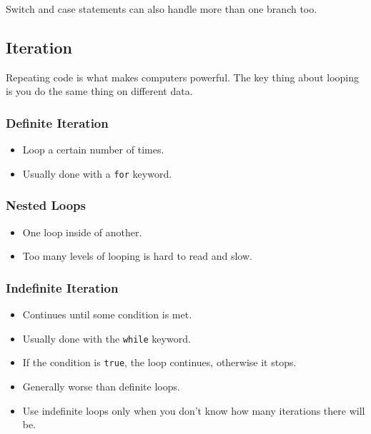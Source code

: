\begin{note}
    Switch and case statements can also handle more than one branch too.
\end{note}

\subsection{Iteration}\label{sub:iteration}

Repeating code is what makes computers powerful.
The key thing about looping is you do the same thing on different data.

\subsubsection{Definite Iteration}\label{ssub:definite-iteration}

\begin{itemize}
    \item Loop a certain number of times.
    \item Usually done with a \texttt{for} keyword.
\end{itemize}

\subsubsection{Nested Loops}\label{ssub:nested-loops}

\begin{itemize}
    \item One loop inside of another.
    \item Too many levels of looping is hard to read and slow.
\end{itemize}

\subsubsection{Indefinite Iteration}\label{ssub:indefinite-iteration}

\begin{itemize}
    \item Continues until some condition is met.
    \item Usually done with the \texttt{while} keyword.
    \item If the condition is \texttt{true}, the loop continues, otherwise it stops.
    \item Generally worse than definite loops.
    \item Use indefinite loops only when you don't know how many iterations there will be.
\end{itemize}
